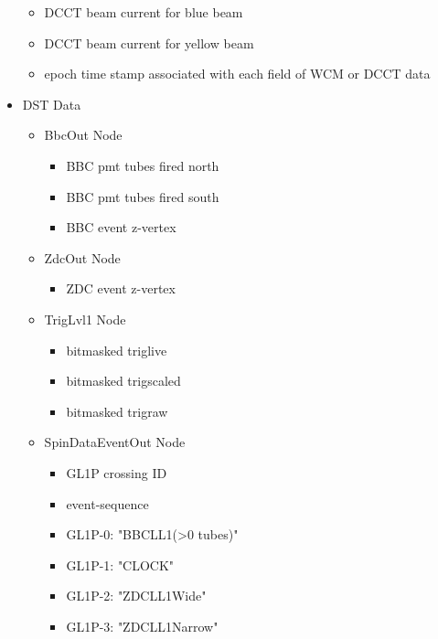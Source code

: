 \begin{itemize}
\begin{itemize}
  \item DCCT beam current for blue beam
  \item DCCT beam current for yellow beam
  \item epoch time stamp associated with each field of WCM or DCCT data
  \end{itemize}
\item DST Data
  \begin{itemize}
  \item BbcOut Node
    \begin{itemize}
      \item BBC pmt tubes fired north
      \item BBC pmt tubes fired south
      \item BBC event z-vertex
    \end{itemize}
  \end{itemize}
  \begin{itemize}
  \item ZdcOut Node
    \begin{itemize}
      \item ZDC event z-vertex
    \end{itemize}
  \end{itemize}
  \begin{itemize}
  \item TrigLvl1 Node
    \begin{itemize}
      \item bitmasked triglive
      \item bitmasked trigscaled
      \item bitmasked trigraw
    \end{itemize}
  \end{itemize}  
  \begin{itemize}
  \item SpinDataEventOut Node
    \begin{itemize}
      \item GL1P crossing ID
      \item event-sequence
      \item GL1P-0: "BBCLL1(\textgreater0 tubes)"
      \item GL1P-1: "CLOCK"
      \item GL1P-2: "ZDCLL1Wide"
      \item GL1P-3: "ZDCLL1Narrow"
    \end{itemize}
  \end{itemize}  
\end{itemize}


